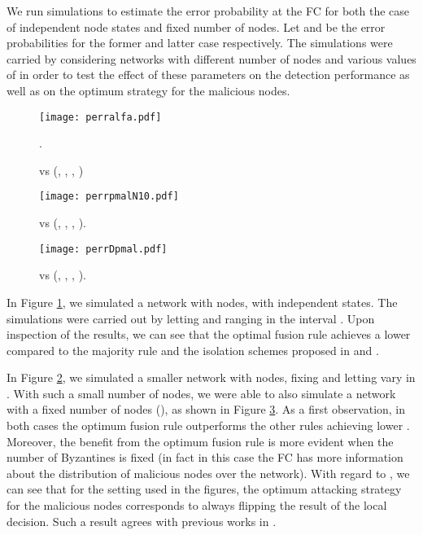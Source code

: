 \documentclass[10pt,peerreview,draftcls,onecolumn]{IEEEtran}
\begin{document}
We run simulations to estimate the error probability at the FC for both the case of independent node states and fixed number of nodes. Let  and  be the error probabilities for the former and latter case respectively.
The simulations were carried by considering networks with different number of nodes and various values of  in order to test the effect of these parameters on the detection performance as well as on the optimum strategy for the malicious nodes.
\begin{figure}[t!]
\centering
\texttt{[image: perralfa.pdf]}
    \caption{ vs  (, , , ) \vspace{-0.7cm}}.
    \label{fig.perralfa}
\end{figure}
\begin{figure}[t!]
\centering
\texttt{[image: perrpmalN10.pdf]}
    \caption{ vs  (, , , ).\vspace{-0.5cm}}
    \label{fig.perrpmalN10}
\end{figure}
\begin{figure}[t!]
\centering
\texttt{[image: perrDpmal.pdf]}
    \caption{ vs  (, , , ).\vspace{-0.5cm}}
    \label{fig.perrDpmal}
\end{figure}


In Figure \ref{fig.perralfa}, we simulated a network with  nodes, with independent states. The simulations were carried out by letting  and  ranging in the interval . Upon inspection of the results, we can see that the optimal fusion rule achieves a lower  compared to the majority rule and the isolation schemes proposed in \cite{Raw11} and \cite{CDC}.

In Figure \ref{fig.perrpmalN10}, we simulated a smaller network with  nodes, fixing  and letting  vary in . With such a small number of nodes, we were able to also simulate a network with a fixed number of nodes (), as shown in   Figure \ref{fig.perrDpmal}. As a first observation, in both cases the optimum fusion rule outperforms the other rules achieving lower . Moreover, the benefit from the optimum fusion rule is more evident when the number of Byzantines is fixed (in fact in this case the FC has more information about the distribution of malicious nodes over the network).
With regard to , we can see that for the setting used in the figures, the optimum attacking strategy for the malicious nodes corresponds to always flipping the result of the local decision. Such a result agrees with previous works in \cite{Raw11,CDC}.
\end{document}
